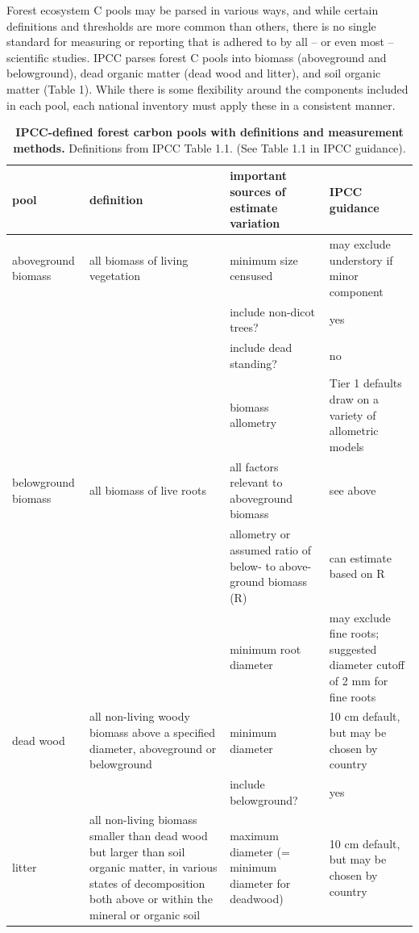\documentclass[, manuscript]{copernicus}
\begin{document}
Forest ecosystem C pools may be parsed in various ways, and while
certain definitions and thresholds are more common than others, there is
no single standard for measuring or reporting that is adhered to by all
-- or even most -- scientific studies. IPCC parses forest C pools into
biomass (aboveground and belowground), dead organic matter (dead wood
and litter), and soil organic matter (Table 1). While there is some
flexibility around the components included in each pool, each national
inventory must apply these in a consistent manner.

\begin{table}

\caption{\label{tab:table_pools}\textbf{IPCC-defined forest carbon pools with definitions and measurement methods.} Definitions from IPCC Table 1.1. (See Table 1.1 in IPCC guidance).}
\centering
\begin{tabu} to 
\hline
\textbf{pool} & \textbf{definition} & \textbf{important sources of estimate variation} & \textbf{IPCC guidance}\\
\hline
aboveground biomass & all biomass of living vegetation & minimum size censused & may exclude understory if minor component\\
\hline
 &  & include non-dicot trees? & yes\\
\hline
 &  & include dead standing? & no\\
\hline
 &  & biomass allometry & Tier 1 defaults draw on a variety of allometric models\\
\hline
belowground biomass & all biomass of live roots & all factors relevant to aboveground biomass & see above\\
\hline
 &  & allometry or assumed ratio of below- to above-ground biomass (R) & can estimate based on R\\
\hline
 &  & minimum root diameter & may exclude fine roots; suggested diameter cutoff of 2 mm for fine roots\\
\hline
dead wood & all non-living woody biomass above a specified diameter, aboveground or belowground & minimum diameter & 10 cm default, but may be chosen by country\\
\hline
 &  & include belowground? & \vphantom{1} yes\\
\hline
litter & all non-living biomass smaller than dead wood but larger than soil organic matter, in various states of decomposition both above or within the mineral or organic soil & maximum diameter (= minimum diameter for deadwood) & 10 cm default, but may be chosen by country\\

\end{tabu}
\end{table}
\end{document}
